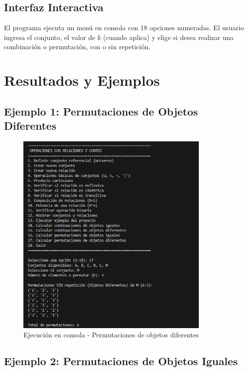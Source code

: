 \documentclass[12pt]{article}
\begin{document}
\subsection{Interfaz Interactiva}
El programa ejecuta un menú en consola con 18 opciones numeradas.  
El usuario ingresa el conjunto, el valor de $k$ (cuando aplica) y elige si desea realizar una combinación o permutación, con o sin repetición.

\section{Resultados y Ejemplos}

\subsection{Ejemplo 1: Permutaciones de Objetos Diferentes}

\begin{figure}[H]
    \centering
    \includegraphics[width=0.85\textwidth]{Foto1.png}
    \caption{Ejecución en consola - Permutaciones de objetos diferentes}
\end{figure}

\subsection{Ejemplo 2: Permutaciones de Objetos Iguales}
\end{document}
